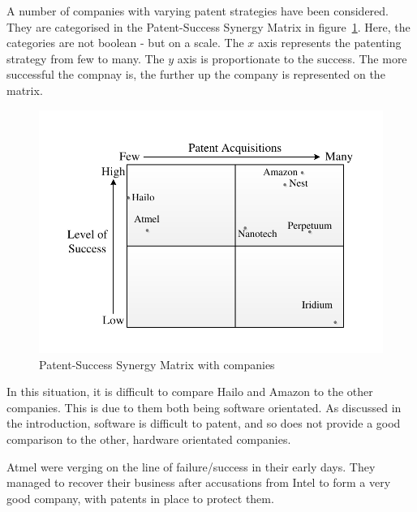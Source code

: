 {}

A number of companies with varying patent strategies have been considered.
They are categorised in the Patent-Success Synergy Matrix in figure~\ref{fig:pssm:companies}.
Here, the categories are not boolean - but on a scale. 
The $x$ axis represents the patenting strategy from few to many.
The $y$ axis is proportionate to the success. 
The more successful the compnay is, the further up the company is represented on the matrix.
\begin{figure}
\centering
\includegraphics{Figures/SuccessMatrixScale.pdf}
\caption{Patent-Success Synergy Matrix with companies}%
\label{fig:pssm:companies}
\end{figure}

In this situation, it is difficult to compare Hailo and Amazon to the other companies. 
This is due to them both being software orientated. 
As discussed in the introduction, software is difficult to patent, and so does not provide a good comparison to the other, hardware orientated companies.

Atmel were verging on the line of failure/success in their early days. 
They managed to recover their business after accusations from Intel to form a very good company, with patents in place to protect them.


